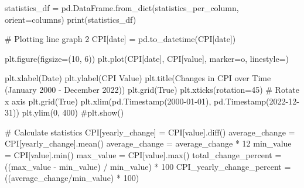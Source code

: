 \documentclass[
  letterpaper,
  DIV=11,
  numbers=noendperiod]{scrartcl}
\newenvironment{Shaded}{\begin{snugshade}}{\end{snugshade}}
\newcommand{\BuiltInTok}[1]{\textcolor[rgb]{0.00,0.23,0.31}{#1}}
\newcommand{\CommentTok}[1]{\textcolor[rgb]{0.37,0.37,0.37}{#1}}
\newcommand{\DecValTok}[1]{\textcolor[rgb]{0.68,0.00,0.00}{#1}}
\newcommand{\NormalTok}[1]{\textcolor[rgb]{0.00,0.23,0.31}{#1}}
\newcommand{\OperatorTok}[1]{\textcolor[rgb]{0.37,0.37,0.37}{#1}}
\newcommand{\StringTok}[1]{\textcolor[rgb]{0.13,0.47,0.30}{#1}}
\newcommand{\VariableTok}[1]{\textcolor[rgb]{0.07,0.07,0.07}{#1}}
\begin{document}
\begin{Shaded}
\begin{Highlighting}[]
\NormalTok{statistics\_df }\OperatorTok{=}\NormalTok{ pd.DataFrame.from\_dict(statistics\_per\_column, orient}\OperatorTok{=}\StringTok{\textquotesingle{}columns\textquotesingle{}}\NormalTok{)}
\BuiltInTok{print}\NormalTok{(statistics\_df)}

\CommentTok{\# Plotting line graph 2 }
\NormalTok{CPI[}\StringTok{\textquotesingle{}date\textquotesingle{}}\NormalTok{] }\OperatorTok{=}\NormalTok{ pd.to\_datetime(CPI[}\StringTok{\textquotesingle{}date\textquotesingle{}}\NormalTok{])}

\NormalTok{plt.figure(figsize}\OperatorTok{=}\NormalTok{(}\DecValTok{10}\NormalTok{, }\DecValTok{6}\NormalTok{))}
\NormalTok{plt.plot(CPI[}\StringTok{\textquotesingle{}date\textquotesingle{}}\NormalTok{], CPI[}\StringTok{\textquotesingle{}value\textquotesingle{}}\NormalTok{], marker}\OperatorTok{=}\StringTok{\textquotesingle{}o\textquotesingle{}}\NormalTok{, linestyle}\OperatorTok{=}\StringTok{\textquotesingle{}{-}\textquotesingle{}}\NormalTok{)}

\NormalTok{plt.xlabel(}\StringTok{\textquotesingle{}Date\textquotesingle{}}\NormalTok{)}
\NormalTok{plt.ylabel(}\StringTok{\textquotesingle{}CPI Value\textquotesingle{}}\NormalTok{)}
\NormalTok{plt.title(}\StringTok{\textquotesingle{}Changes in CPI over Time (January 2000 {-} December 2022)\textquotesingle{}}\NormalTok{)}
\NormalTok{plt.grid(}\VariableTok{True}\NormalTok{)}
\NormalTok{plt.xticks(rotation}\OperatorTok{=}\DecValTok{45}\NormalTok{)  }\CommentTok{\# Rotate x axis}
\NormalTok{plt.grid(}\VariableTok{True}\NormalTok{)}
\NormalTok{plt.xlim(pd.Timestamp(}\StringTok{\textquotesingle{}2000{-}01{-}01\textquotesingle{}}\NormalTok{), pd.Timestamp(}\StringTok{\textquotesingle{}2022{-}12{-}31\textquotesingle{}}\NormalTok{))}
\NormalTok{plt.ylim(}\DecValTok{0}\NormalTok{, }\DecValTok{400}\NormalTok{)}
\CommentTok{\#plt.show()}

\CommentTok{\# Calculate statistics}
\NormalTok{CPI[}\StringTok{\textquotesingle{}yearly\_change\textquotesingle{}}\NormalTok{] }\OperatorTok{=}\NormalTok{ CPI[}\StringTok{\textquotesingle{}value\textquotesingle{}}\NormalTok{].diff() }
\NormalTok{average\_change }\OperatorTok{=}\NormalTok{ CPI[}\StringTok{\textquotesingle{}yearly\_change\textquotesingle{}}\NormalTok{].mean() }
\NormalTok{average\_change }\OperatorTok{=}\NormalTok{ average\_change }\OperatorTok{*} \DecValTok{12}
\NormalTok{min\_value }\OperatorTok{=}\NormalTok{ CPI[}\StringTok{\textquotesingle{}value\textquotesingle{}}\NormalTok{].}\BuiltInTok{min}\NormalTok{()}
\NormalTok{max\_value }\OperatorTok{=}\NormalTok{ CPI[}\StringTok{\textquotesingle{}value\textquotesingle{}}\NormalTok{].}\BuiltInTok{max}\NormalTok{()}
\NormalTok{total\_change\_percent }\OperatorTok{=}\NormalTok{ ((max\_value }\OperatorTok{{-}}\NormalTok{ min\_value) }\OperatorTok{/}\NormalTok{ min\_value) }\OperatorTok{*} \DecValTok{100}
\NormalTok{CPI\_yearly\_change\_percent }\OperatorTok{=}\NormalTok{ ((average\_change}\OperatorTok{/}\NormalTok{min\_value) }\OperatorTok{*} \DecValTok{100}\NormalTok{)}



\end{Highlighting}
\end{Shaded}
\end{document}
